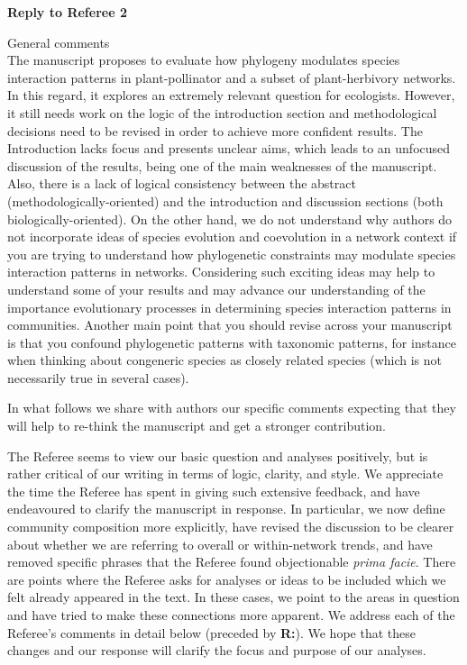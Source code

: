 \documentclass[12pt]{letter}
\newenvironment{refquote}{\bigskip \begin{it}}{\end{it}\smallskip}
\begin{document}
\clearpage

{\Large \bf Reply to Referee 2} 


	\begin{refquote}
	General comments\\

	The manuscript proposes to evaluate how phylogeny modulates species interaction patterns in plant-pollinator and a subset of plant-herbivory networks. In this regard, it explores an extremely relevant question for ecologists. However, it still needs work on the logic of the introduction section and methodological decisions need to be revised in order to achieve more confident results. The Introduction lacks focus and presents unclear aims, which leads to an unfocused discussion of the results, being one of the main weaknesses of the manuscript. Also, there is a lack of logical consistency between the abstract (methodologically-oriented) and the introduction and discussion sections (both biologically-oriented). On the other hand, we do not understand why authors do not incorporate ideas of species evolution and coevolution in a network context if you are trying to understand how phylogenetic constraints may modulate species interaction patterns in networks. Considering such exciting ideas may help to understand some of your results and may advance our understanding of  the importance evolutionary processes in determining species interaction patterns in communities.
	Another main point that you should revise across your manuscript is that you confound phylogenetic patterns with taxonomic patterns, for instance when thinking about congeneric species as closely related species (which is not necessarily true in several cases).

	\smallskip

	In what follows we share with authors our specific comments expecting that they will help to re-think the manuscript and get a stronger contribution.

	\end{refquote}


	The Referee seems to view our basic question and analyses positively, but is rather critical of our writing in terms of logic, clarity, and style. We appreciate the time the Referee has spent in giving such extensive feedback, and have endeavoured to clarify the manuscript in response. In particular, we now define community composition more explicitly, have revised the discussion to be clearer about whether we are referring to overall or within-network trends, and have removed specific phrases that the Referee found objectionable \emph{prima facie}. There are points where the Referee asks for analyses or ideas to be included which we felt already appeared in the text. In these cases, we point to the areas in question and have tried to make these connections more apparent. 	
	We address each of the Referee's comments in detail below (preceded by \textbf{R:}). We hope that these changes and our response will clarify the focus and purpose of our analyses.
\end{document}
